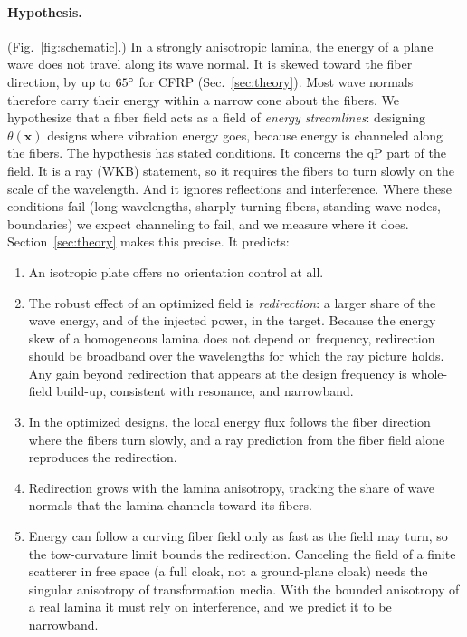 \paragraph{Hypothesis.} (Fig.~\ref{fig:schematic}.) In a strongly anisotropic lamina, the energy of a plane wave does
not travel along its wave normal. It is skewed toward the fiber direction, by up to
$65^\circ$ for CFRP (Sec.~\ref{sec:theory}). Most wave normals therefore carry their
energy within a narrow cone about the fibers. We hypothesize that a fiber field acts as a
field of \emph{energy streamlines}: designing $\theta(\bm x)$ designs where vibration
energy goes, because energy is channeled along the fibers. The hypothesis has stated conditions. It
concerns the qP part of the field. It is a ray (WKB) statement, so it requires the fibers to turn
slowly on the scale of the wavelength. And it ignores reflections and interference. Where these
conditions fail (long wavelengths, sharply turning fibers, standing-wave nodes, boundaries) we expect
channeling to fail, and we measure where it does. Section~\ref{sec:theory}
makes this precise. It predicts:
\begin{enumerate}[label=\textbf{W\arabic*},leftmargin=2.4em,itemsep=1pt]
\item An isotropic plate offers no orientation control at all.
\item The robust effect of an optimized field is \emph{redirection}: a larger share of
  the wave energy, and of the injected power, in the target. Because the energy skew of a homogeneous
  lamina does not depend on frequency, redirection should be broadband over the wavelengths for which
  the ray picture holds. Any gain beyond redirection that appears at the design frequency is
  whole-field build-up, consistent with resonance, and narrowband.
\item In the optimized designs, the local energy flux follows the fiber direction where the
  fibers turn slowly, and a ray prediction from the fiber field alone reproduces the redirection.
\item Redirection grows with the lamina anisotropy, tracking the share of wave normals
  that the lamina channels toward its fibers.
\item Energy can follow a curving fiber field only as fast as the field may turn, so the
  tow-curvature limit bounds the redirection. Canceling the field of a finite scatterer in free space (a full cloak, not a
  ground-plane cloak) needs the singular anisotropy of transformation media. With the
  bounded anisotropy of a real lamina it must rely on interference, and we predict it to be
  narrowband.
\end{enumerate}

